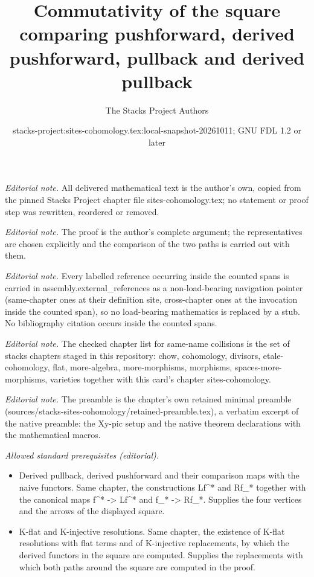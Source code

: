 \documentclass[10pt,a4paper]{amsart}
\title{Commutativity of the square comparing pushforward, derived pushforward, pullback and derived pullback}
\author{The Stacks Project Authors}
\date{stacks-project:sites-cohomology.tex:local-snapshot-20261011; GNU FDL 1.2 or later}
\theoremstyle{plain}
\theoremstyle{definition}
\theoremstyle{remark}
\numberwithin{equation}{subsection}
\begin{document}
\maketitle
\noindent\textit{Editorial note.} All delivered mathematical text is the author's own, copied from the pinned Stacks Project chapter file sites-cohomology.tex; no statement or proof step was rewritten, reordered or removed.\par\medskip
\noindent\textit{Editorial note.} The proof is the author's complete argument; the representatives are chosen explicitly and the comparison of the two paths is carried out with them.\par\medskip
\noindent\textit{Editorial note.} Every labelled reference occurring inside the counted spans is carried in assembly.external\_references as a non-load-bearing navigation pointer (same-chapter ones at their definition site, cross-chapter ones at the invocation inside the counted span), so no load-bearing mathematics is replaced by a stub. No bibliography citation occurs inside the counted spans.\par\medskip
\noindent\textit{Editorial note.} The checked chapter list for same-name collisions is the set of stacks chapters staged in this repository: chow, cohomology, divisors, etale-cohomology, flat, more-algebra, more-morphisms, morphisms, spaces-more-morphisms, varieties together with this card's chapter sites-cohomology.\par\medskip
\noindent\textit{Editorial note.} The preamble is the chapter's own retained minimal preamble (sources/stacks-sites-cohomology/retained-preamble.tex), a verbatim excerpt of the native preamble: the Xy-pic setup and the native theorem declarations with the mathematical macros.\par\medskip
\noindent\textit{Allowed standard prerequisites (editorial).}\begin{itemize}
\item Derived pullback, derived pushforward and their comparison maps with the naive functors. Same chapter, the constructions Lf\textasciicircum{}* and Rf\_* together with the canonical maps f\textasciicircum{}* -> Lf\textasciicircum{}* and f\_* -> Rf\_*. Supplies the four vertices and the arrows of the displayed square.
\item K-flat and K-injective resolutions. Same chapter, the existence of K-flat resolutions with flat terms and of K-injective replacements, by which the derived functors in the square are computed. Supplies the replacements with which both paths around the square are computed in the proof.
\end{itemize}\medskip
\end{document}
